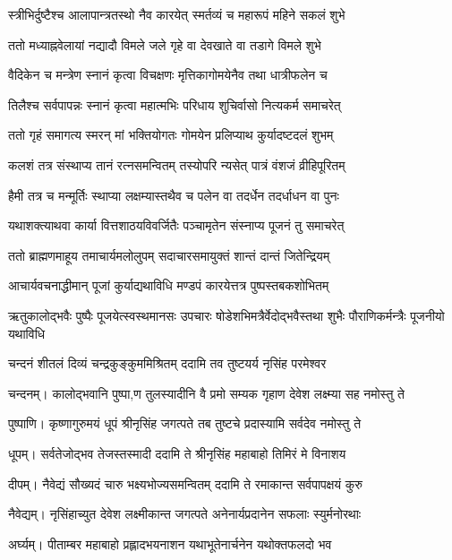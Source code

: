 \twolineshloka
{स्त्रीभिर्दुष्टैश्च आलापान्त्रतस्थो नैव कारयेत्}
{स्मर्तव्यं च महारूपं महिने सकलं शुभे} %

\twolineshloka
{ततो मध्याह्नवेलायां नद्यादौ विमले जले}
{गृहे वा देवखाते वा तडागे विमले शुभे} %

\twolineshloka
{वैदिकेन च मन्त्रेण स्नानं कृत्वा विचक्षणः}
{मृत्तिकागोमयेनैव तथा धात्रीफलेन च} %

\twolineshloka
{तिलैश्च सर्वपापन्नः स्नानं कृत्वा महात्मभिः}
{परिधाय शुचिर्वासो नित्यकर्म समाचरेत्} %

\twolineshloka
{ततो गृहं समागत्य स्मरन् मां भक्तियोगतः}
{गोमयेन प्रलिप्याथ कुर्यादष्टदलं शुभम्} %

\twolineshloka
{कलशं तत्र संस्थाप्य तानं रत्नसमन्वितम्}
{तस्योपरि न्यसेत् पात्रं वंशजं व्रीहिपूरितम्} %

\twolineshloka
{हैमी तत्र च मन्मूर्तिः स्थाप्या लक्षम्यास्तथैव च}
{पलेन वा तदर्धेन तदर्धाधन वा पुनः} %

\twolineshloka
{यथाशक्त्याथवा कार्या वित्तशाठयविवर्जितैः}
{पञ्चामृतेन संस्नाप्य पूजनं तु समाचरेत्} %

\twolineshloka
{ततो ब्राह्मणमाहूय तमाचार्यमलोलुपम्}
{सदाचारसमायुक्तं शान्तं दान्तं जितेन्द्रियम्} %

\twolineshloka
{आचार्यवचनाद्धीमान् पूजां कुर्याद्यथाविधि}
{मण्डपं कारयेत्तत्र पुष्पस्तबकशोभितम्} %

\threelineshloka
{ऋतुकालोद्भवैः पुष्पैः पूजयेत्स्वस्थमानसः}
{उपचारः षोडेशभिमत्रैर्वेदोद्भवैस्तथा} %
{शुभैः पौराणिकर्मन्त्रैः पूजनीयो यथाविधि}

\twolineshloka
{चन्दनं शीतलं दिव्यं चन्द्रकुङ्कुममिश्रितम्}
{ददामि तव तुष्टयर्य नृसिंह परमेश्वर} %

चन्दनम्।
\twolineshloka
{कालोद्भवानि पुष्पा,ण तुलस्यादीनि वै प्रमो}
{सम्यक गृहाण देवेश लक्ष्म्या सह नमोस्तु ते} %

पुष्पाणि।
\twolineshloka
{कृष्णागुरुमयं धूपं श्रीनृसिंह जगत्पते}
{तब तुष्टचे प्रदास्यामि सर्वदेव नमोस्तु ते} %

धूपम्।
\twolineshloka
{सर्वतेजोद्भव तेजस्तस्मादी ददामि ते}
{श्रीनृसिंह महाबाहो तिमिरं मे विनाशय} %

दीपम्।
\twolineshloka
{नैवेद्यं सौख्यदं चारु भक्ष्यभोज्यसमन्वितम्}
{ददामि ते रमाकान्त सर्वपापक्षयं कुरु} %

नैवेद्यम्।
\twolineshloka
{नृसिंहाच्युत देवेश लक्ष्मीकान्त जगत्पते}
{अनेनार्यप्रदानेन सफलाः स्युर्मनोरथाः} %

अर्घ्यम्।
\twolineshloka
{पीताम्बर महाबाहो प्रह्लादभयनाशन}
{यथाभूतेनार्चनेन यथोक्तफलदो भव} %

